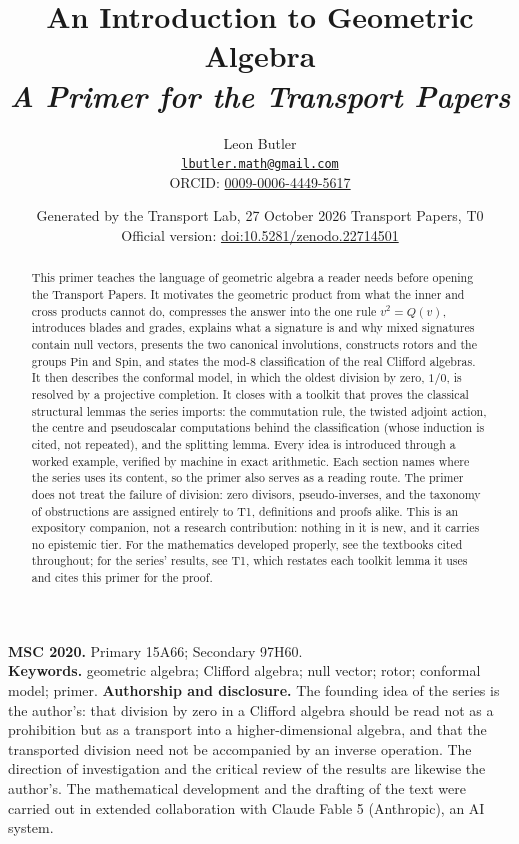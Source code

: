 \documentclass[11pt]{article}
\title{\bfseries An Introduction to Geometric Algebra\\[4pt]\large\itshape A Primer for the Transport Papers}
\author{Leon Butler\\ \normalsize\href{mailto:lbutler.math@gmail.com}{\texttt{lbutler.math@gmail.com}}\\ \normalsize ORCID: \href{https://orcid.org/0009-0006-4449-5617}{0009-0006-4449-5617}}
\date{Generated by the Transport Lab, 27 October 2026 \textperiodcentered{} Transport Papers, T0\\[3pt]\small Official version: \href{https://doi.org/10.5281/zenodo.22714501}{doi:10.5281/zenodo.22714501}}
\theoremstyle{definition}
\theoremstyle{plain}
\providecommand{\Pin}{}\renewcommand{\Pin}{\mathrm{Pin}}
\providecommand{\Spin}{}\renewcommand{\Spin}{\mathrm{Spin}}
\begin{document}
\maketitle
\begin{abstract}
\normalsize
This primer teaches the language of geometric algebra a reader needs before opening the Transport Papers. It motivates the geometric product from what the inner and cross products cannot do, compresses the answer into the one rule $v^{2} = Q(v)$, introduces blades and grades, explains what a signature is and why mixed signatures contain null vectors, presents the two canonical involutions, constructs rotors and the groups $\Pin$ and $\Spin$, and states the mod-8 classification of the real Clifford algebras. It then describes the conformal model, in which the oldest division by zero, $1/0$, is resolved by a projective completion. It closes with a toolkit that proves the classical structural lemmas the series imports: the commutation rule, the twisted adjoint action, the centre and pseudoscalar computations behind the classification (whose induction is cited, not repeated), and the splitting lemma. Every idea is introduced through a worked example, verified by machine in exact arithmetic. Each section names where the series uses its content, so the primer also serves as a reading route. The primer does not treat the failure of division: zero divisors, pseudo-inverses, and the taxonomy of obstructions are assigned entirely to T1, definitions and proofs alike. This is an expository companion, not a research contribution: nothing in it is new, and it carries no epistemic tier. For the mathematics developed properly, see the textbooks cited throughout; for the series' results, see T1, which restates each toolkit lemma it uses and cites this primer for the proof.
\end{abstract}
\medskip
\noindent\textbf{MSC 2020.} Primary 15A66; Secondary 97H60.\\
\textbf{Keywords.} geometric algebra; Clifford algebra; null vector; rotor; conformal model; primer.
\newpage
\noindent \textbf{Authorship and disclosure. }The founding idea of the series is the author's: that division by zero in a Clifford algebra should be read not as a prohibition but as a transport into a higher-dimensional algebra, and that the transported division need not be accompanied by an inverse operation. The direction of investigation and the critical review of the results are likewise the author's. The mathematical development and the drafting of the text were carried out in extended collaboration with Claude Fable 5 (Anthropic), an AI system.
\end{document}

